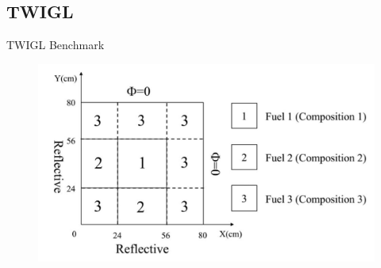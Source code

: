 \documentclass[8pt]{beamer}
\begin{document}
\subsection{TWIGL}

\begin{frame}{TWIGL Benchmark}
\begin{figure}
\includegraphics[width=\linewidth]{figures/TWIGL_regions.jpg}
\end{figure}
\end{frame}
\end{document}

